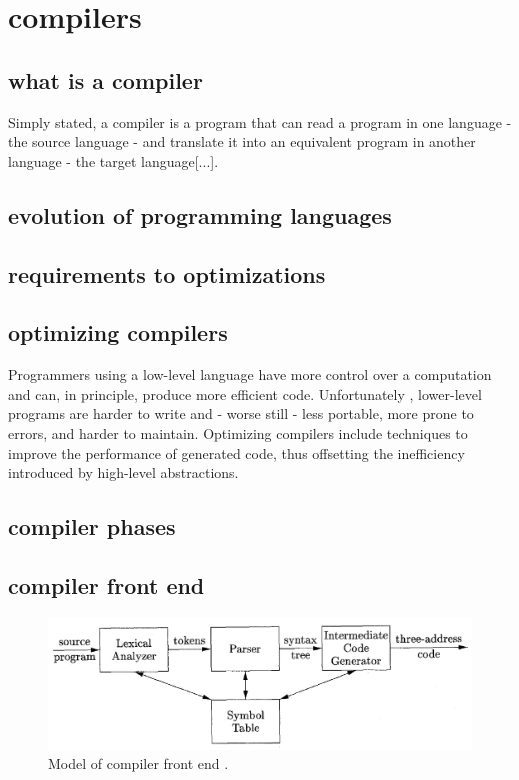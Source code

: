 \section{compilers}
\subsection{what is a compiler}
Simply stated, a compiler is a program that can read a program in one language - the source language - and translate it into an equivalent program in another language - the target language[...]. 

\subsection{evolution of programming languages}

\subsection{requirements to optimizations}

\subsection{optimizing compilers}
Programmers using a low-level language have more control over a computation and can, in principle, produce more efficient code. Unfortunately , lower-level programs are harder to write and - worse still - less portable, more prone to errors, and harder to maintain. Optimizing compilers include techniques to improve the performance of generated code, thus offsetting the inefficiency introduced by high-level abstractions. 

\subsection{compiler phases}


\subsection{compiler front end}
\begin{figure}[!htbp]
	\centering
	\includegraphics[width=1.0\linewidth]{PICs/compiler_front_end}
	\caption{Model of compiler front end .}\label{compiler_front_end}
\end{figure}

